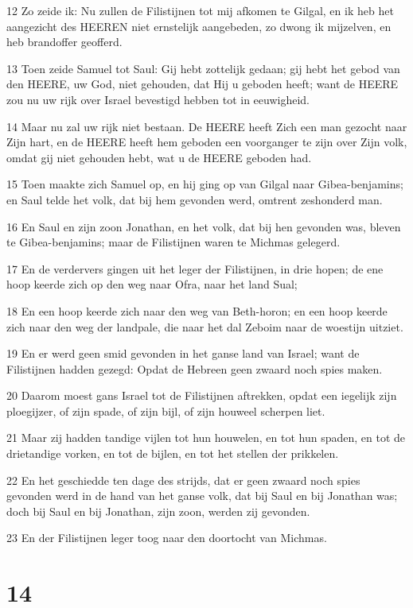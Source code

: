 \par 12 Zo zeide ik: Nu zullen de Filistijnen tot mij afkomen te Gilgal, en ik heb het aangezicht des HEEREN niet ernstelijk aangebeden, zo dwong ik mijzelven, en heb brandoffer geofferd.
\par 13 Toen zeide Samuel tot Saul: Gij hebt zottelijk gedaan; gij hebt het gebod van den HEERE, uw God, niet gehouden, dat Hij u geboden heeft; want de HEERE zou nu uw rijk over Israel bevestigd hebben tot in eeuwigheid.
\par 14 Maar nu zal uw rijk niet bestaan. De HEERE heeft Zich een man gezocht naar Zijn hart, en de HEERE heeft hem geboden een voorganger te zijn over Zijn volk, omdat gij niet gehouden hebt, wat u de HEERE geboden had.
\par 15 Toen maakte zich Samuel op, en hij ging op van Gilgal naar Gibea-benjamins; en Saul telde het volk, dat bij hem gevonden werd, omtrent zeshonderd man.
\par 16 En Saul en zijn zoon Jonathan, en het volk, dat bij hen gevonden was, bleven te Gibea-benjamins; maar de Filistijnen waren te Michmas gelegerd.
\par 17 En de verdervers gingen uit het leger der Filistijnen, in drie hopen; de ene hoop keerde zich op den weg naar Ofra, naar het land Sual;
\par 18 En een hoop keerde zich naar den weg van Beth-horon; en een hoop keerde zich naar den weg der landpale, die naar het dal Zeboim naar de woestijn uitziet.
\par 19 En er werd geen smid gevonden in het ganse land van Israel; want de Filistijnen hadden gezegd: Opdat de Hebreen geen zwaard noch spies maken.
\par 20 Daarom moest gans Israel tot de Filistijnen aftrekken, opdat een iegelijk zijn ploegijzer, of zijn spade, of zijn bijl, of zijn houweel scherpen liet.
\par 21 Maar zij hadden tandige vijlen tot hun houwelen, en tot hun spaden, en tot de drietandige vorken, en tot de bijlen, en tot het stellen der prikkelen.
\par 22 En het geschiedde ten dage des strijds, dat er geen zwaard noch spies gevonden werd in de hand van het ganse volk, dat bij Saul en bij Jonathan was; doch bij Saul en bij Jonathan, zijn zoon, werden zij gevonden.
\par 23 En der Filistijnen leger toog naar den doortocht van Michmas.

\chapter{14}

